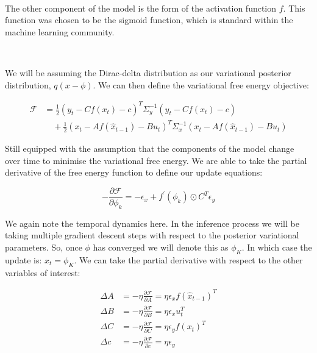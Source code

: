 \documentclass{article}
\begin{document}
\

The other component of the model is the form of the activation function $f$. This function was chosen to be the sigmoid function, which is standard within the machine learning community. 

\

We will be assuming the Dirac-delta distribution as our variational posterior distribution, $q(x - \phi)$. We can then define the variational free energy objective:

\begin{equation}
    \begin{aligned}
        \mathcal{F} &= \frac{1}{2} \left(y_t - C f\left(x_t\right) - c\right)^T \Sigma_y^{-1} \left(y_t - C f\left(x_t\right) - c\right) \\
        &\quad + \frac{1}{2} \left(x_t - A f\left(\hat{x}_{t-1}\right) - B u_t\right)^T \Sigma_x^{-1} \left(x_t - A f\left(\hat{x}_{t-1}\right) - B u_t\right)
    \end{aligned}
\end{equation}

Still equipped with the assumption that the components of the model change over time to minimise the variational free energy. We are able to take the partial derivative of the free energy function to define our update equations:

\begin{equation}\label{eq:tpc_neural}
	-\frac{\partial \mathcal{F}}{\partial\phi_k}=-\epsilon_x+f^{\prime}\left(\phi_k\right) \odot C^T \epsilon_y
\end{equation}

We again note the temporal dynamics here. In the inference process we will be taking multiple gradient descent steps with respect to the posterior variational parameters. So, once $\phi$ has converged we will denote this as $\phi_K$. In which case the update is: $x_t = \phi_K$. We can take the partial derivative with respect to the other variables of interest:

\begin{equation}
    \begin{aligned}
        \Delta A &= -\eta \frac{\partial \mathcal{F}}{\partial A} = \eta \epsilon_x f\left(\hat{x}_{t-1}\right)^T \\
        \Delta B &= -\eta \frac{\partial \mathcal{F}}{\partial B} = \eta \epsilon_x u_t^T \\
        \Delta C &= -\eta \frac{\partial \mathcal{F}}{\partial C} = \eta \epsilon_y f\left(x_t\right)^T \\
        \Delta c &= -\eta \frac{\partial \mathcal{F}}{\partial c} = \eta \epsilon_y
    \end{aligned}
\end{equation}
\end{document}
